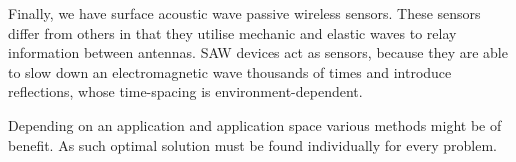 \documentclass[11pt,a4paper]{article}
\begin{document}
Finally, we have surface acoustic wave passive wireless sensors. These sensors differ from others in that they utilise mechanic and elastic waves to relay information between antennas. SAW devices act as sensors, because they are able to slow down an electromagnetic wave thousands of times and introduce reflections, whose time-spacing is environment-dependent.

Depending on an application and application space various methods might be of benefit. As such optimal solution must be found individually for every problem.

{}

\end{document}
